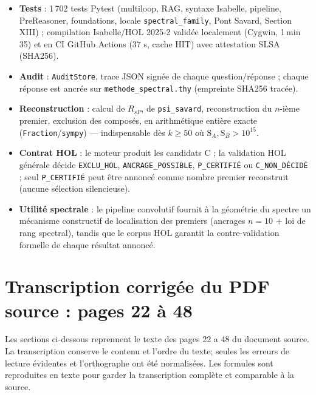 \documentclass[11pt,a4paper]{article}
\newcommand{\SA}{\mathrm{S}_A}
\newcommand{\SB}{\mathrm{S}_B}
\begin{document}
\begin{itemize}[nosep]
  \item \textbf{Tests} : 1\,702 tests Pytest (multiloop, RAG, syntaxe Isabelle, pipeline, PreReasoner, foundations, locale \texttt{spectral\_family}, Pont Savard, Section XIII) ; compilation Isabelle/HOL 2025-2 validée localement (Cygwin, 1\,min\,35) et en CI GitHub Actions (37 s, cache HIT) avec attestation SLSA (SHA256).
  \item \textbf{Audit} : \texttt{AuditStore}, trace JSON signée de chaque question/réponse ; chaque réponse est ancrée sur \texttt{methode\_spectral.thy} (empreinte SHA256 tracée).
  \item \textbf{Reconstruction} : calcul de $R_{sP}$, de \texttt{psi\_savard}, reconstruction du $n$-ième premier, exclusion des composés, en arithmétique entière exacte (\texttt{Fraction}/\texttt{sympy}) --- indispensable dès $k \ge 50$ où $\SA, \SB > 10^{15}$.
  \item \textbf{Contrat HOL} : le moteur produit les candidats C ; la validation HOL générale décide \texttt{EXCLU\_HOL}, \texttt{ANCRAGE\_POSSIBLE}, \texttt{P\_CERTIFIÉ} ou \texttt{C\_NON\_DÉCIDÉ} ; seul \texttt{P\_CERTIFIÉ} peut être annoncé comme nombre premier reconstruit (aucune sélection silencieuse).
  \item \textbf{Utilité spectrale} : le pipeline convolutif fournit à la géométrie du spectre un mécanisme constructif de localisation des premiers (ancrages $n=10$ + loi de rang spectral), tandis que le corpus HOL garantit la contre-validation formelle de chaque résultat annoncé.
\end{itemize}

\clearpage
\section*{Transcription corrig\'ee du PDF source : pages 22 \`a 48}
Les sections ci-dessous reprennent le texte des pages 22 a 48 du document source. La
transcription conserve le contenu et l'ordre du texte; seules les erreurs de lecture
\'evidentes et l'orthographe ont \'et\'e normalis\'ees. Les formules sont reproduites en
texte pour garder la transcription compl\`ete et comparable \`a la source.
\smallskip
\end{document}
